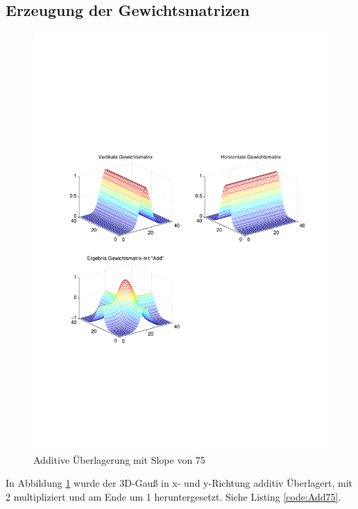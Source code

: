 \subsection{Erzeugung der Gewichtsmatrizen \label{eGeW}} 
\begin{figure}[hbt]
	\centering
	\includegraphics[trim=70 191 42 152, clip, width=0.95\linewidth]{./Bilder/Auswertung/GewichtmatrixEinzelschritte/Endergebnis_Gewichtsmatrix_Slope_75_Type_Add}
	\caption{Additive Überlagerung mit Slope von 75}
	\label{Add75}
\end{figure}
In Abbildung \ref{Add75} wurde der 3D-Gauß in x- und y-Richtung additiv Überlagert, mit 2 multipliziert und am Ende um 1 heruntergesetzt. Siehe Listing \ref{code:Add75}.
 \label{code:Add75}

